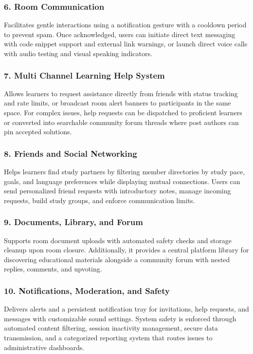 \documentclass[12pt]{article}
\begin{document}
\subsubsection{6. Room Communication}
Facilitates gentle interactions using a notification gesture with a cooldown period to prevent spam. Once acknowledged, users can initiate direct text messaging with code snippet support and external link warnings, or launch direct voice calls with audio testing and visual speaking indicators.

\subsubsection{7. Multi Channel Learning Help System}
Allows learners to request assistance directly from friends with status tracking and rate limits, or broadcast room alert banners to participants in the same space. For complex issues, help requests can be dispatched to proficient learners or converted into searchable community forum threads where post authors can pin accepted solutions.

\subsubsection{8. Friends and Social Networking}
Helps learners find study partners by filtering member directories by study pace, goals, and language preferences while displaying mutual connections. Users can send personalized friend requests with introductory notes, manage incoming requests, build study groups, and enforce communication limits.

\subsubsection{9. Documents, Library, and Forum}
Supports room document uploads with automated safety checks and storage cleanup upon room closure. Additionally, it provides a central platform library for discovering educational materials alongside a community forum with nested replies, comments, and upvoting.

\subsubsection{10. Notifications, Moderation, and Safety}
Delivers alerts and a persistent notification tray for invitations, help requests, and messages with customizable sound settings. System safety is enforced through automated content filtering, session inactivity management, secure data transmission, and a categorized reporting system that routes issues to administrative dashboards.
\end{document}
